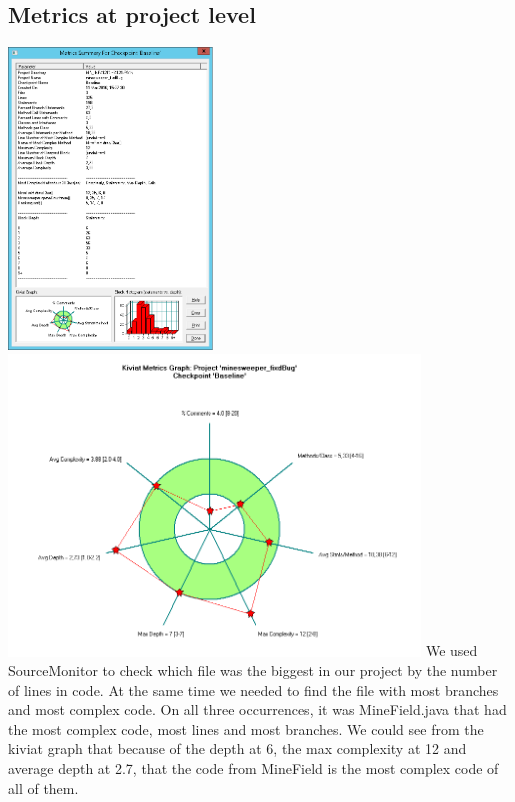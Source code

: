 \documentclass[UKenglish]{article}  %
\begin{document}
\subsection{Metrics at project level}
\includegraphics[height=8cm]{metric_summary}
\includegraphics[height=8cm]{kiviat_diagram_baseline}
We used SourceMonitor to check which file was the biggest in our project by the number of lines in code. At the same time we needed to find the file with most branches and most complex code. On all three occurrences, it was MineField.java that had the most complex code, most lines and most branches. We could see from the kiviat graph that because of the depth at 6, the max complexity at 12 and average depth at 2.7, that the code from MineField is the most complex code of all of them. 
\end{document}

